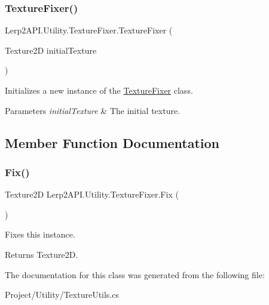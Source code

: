 \subsubsection{\texorpdfstring{Texture\+Fixer()}{TextureFixer()}}
{\footnotesize\ttfamily Lerp2\+A\+P\+I.\+Utility.\+Texture\+Fixer.\+Texture\+Fixer (\begin{DoxyParamCaption}\item[{Texture2D}]{initial\+Texture }\end{DoxyParamCaption})\hspace{0.3cm}{\ttfamily [inline]}}



Initializes a new instance of the \hyperlink{class_lerp2_a_p_i_1_1_utility_1_1_texture_fixer}{Texture\+Fixer} class. 


\begin{DoxyParams}{Parameters}
{\em initial\+Texture} & The initial texture.\\
\hline
\end{DoxyParams}


\subsection{Member Function Documentation}
\mbox{\label{class_lerp2_a_p_i_1_1_utility_1_1_texture_fixer_a65f0a37ada97895b5045b94192e28d9f}} 
\subsubsection{\texorpdfstring{Fix()}{Fix()}}
{\footnotesize\ttfamily Texture2D Lerp2\+A\+P\+I.\+Utility.\+Texture\+Fixer.\+Fix (\begin{DoxyParamCaption}{ }\end{DoxyParamCaption})\hspace{0.3cm}{\ttfamily [inline]}}



Fixes this instance. 

\begin{DoxyReturn}{Returns}
Texture2D.
\end{DoxyReturn}


The documentation for this class was generated from the following file\+:\begin{DoxyCompactItemize}
\item 
Project/\+Utility/Texture\+Utils.\+cs\end{DoxyCompactItemize}
